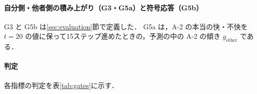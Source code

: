\paragraph{自分側・他者側の積み上がり（G3・G5a）と符号応答（G5b）}
G3 と G5b は\ref{sec:evaluation}節で定義した．
G5a は，A-2 の本当の快・不快を $t=20$ の値に保って15ステップ進めたときの，予測の中の A-2 の傾き $g_{\mathrm{other}}$ である．

\paragraph{判定}
各指標の判定を表\ref{tab:gates}に示す．

\begin{table}[t]
  \centering
  \small
  \caption{段階Iの関門の判定}
  \label{tab:gates}
  
\end{table}
